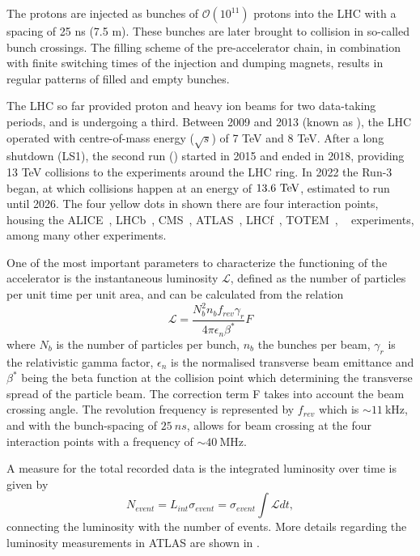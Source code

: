 The protons are injected as bunches of \(\mathcal{O}(10^{11})\) protons into the \ac{LHC} with a spacing of 25 ns (7.5 m). These bunches are later brought to collision in so-called bunch crossings. The filling scheme of the pre-accelerator chain, in combination with finite switching times of the injection and dumping magnets, results in regular patterns of filled and empty bunches.

The \ac{LHC} so far provided proton and heavy ion beams for two data-taking periods, and is undergoing a third. Between 2009 and 2013 (known as \RunOne), the \ac{LHC} operated with centre-of-mass energy ($\sqrt{s}$) of 7 TeV and 8 TeV.  After a long shutdown (LS1), the second run (\RunTwo) started in 2015 and ended in 2018, providing 13 TeV collisions to the experiments around the \ac{LHC} ring. In 2022 the Run-3 began, at which \pp collisions happen at an energy of \(13.6~\text{TeV}\), estimated to run until 2026.
The four yellow dots in shown \Fig{\ref{fig:atlas:lhc:lhc}} there are four interaction points, housing the \acs{ALICE}~\cite{ALICE}, \acs{LHCb}~\cite{LHCb}, \acs{CMS}~\cite{CMS}, \acs{ATLAS}~\cite{AtlasExperiment}, \acs{LHCf}~\cite{LHCf}, \acs{TOTEM}~\cite{TOTEM}, ~\cite{MoEDAL} experiments, among many other experiments.


One of the most important parameters to characterize the functioning of the accelerator is the instantaneous luminosity \(\mathcal{L}\), defined as the number of particles per unit time per unit area, and can be calculated from the relation
\begin{equation}
    \mathcal{L} = \frac{N_b^ 2n_b f_{rev}\gamma_r}{4\pi\epsilon_n\beta^*}F
    \label{eq:atlas:LHC:instantaneous_lumi}
\end{equation}
where $N_b$ is the number of particles per bunch, $n_b$ the bunches per beam, $\gamma_r$ is the relativistic gamma factor, $\epsilon_n$ is the normalised transverse beam emittance and $\beta^*$ being the beta function at the collision point which determining the transverse spread of the particle beam. The correction term F takes into account the beam crossing angle. The revolution frequency is represented by $f_{rev}$ which is \(\sim 11~\)kHz, and with the bunch-spacing of \(25~ns\), allows for beam crossing at the four interaction points with a frequency of \(\sim 40~\)MHz. 

A measure for the total recorded data is the integrated luminosity over time is given by
\begin{equation}
    N_{event} = L_{int} \sigma_{event} = \sigma_{event} \int \mathcal{L} dt,
    \label{eq:atlas:LHC:integrated_lumi}
\end{equation}
connecting the luminosity with the number of events. More details regarding the luminosity measurements in \ac{ATLAS} are shown in \Sect{\ref{sec:atlas:runs}}.








